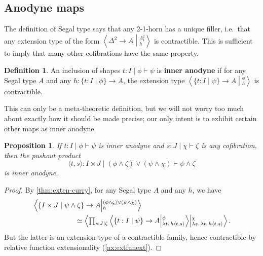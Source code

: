 \documentclass{amsart}
\theoremstyle{plain}
\newtheorem{prop}[thm]{Proposition}
\theoremstyle{definition}
\newtheorem{defn}[thm]{Definition}
\theoremstyle{remark}
\numberwithin{equation}{section}
\newcommand{\exten}[4]{\left\langle\mathchoice{\textstyle\prod_{#1}}{\textstyle\prod_{#1}}{\scriptstyle\prod_{#1}}{\scriptscriptstyle\prod_{#1}} #2 \middle|^{#3}_{#4}\right\rangle}
\newcommand{\ndexten}[4]{\left\langle #1 \to #2 \middle|^{#3}_{#4}\right\rangle}
\newcommand{\types}{\vdash}
\newcommand{\sh}[2]{\{#1\mid #2\}}
\newcommand{\pair}[1]{\langle #1\rangle}
\newcommand{\lam}[1]{\lambda #1.\,}
\begin{document}
\subsection{Anodyne maps}
\label{sec:anodyne}

The definition of Segal type says that any 2-1-horn has a unique filler, i.e.\ that any extension type of the form $\ndexten{\Delta^2}{A}{\Lambda^2_1}{h}$ is contractible.
This is sufficient to imply that many other cofibrations have the same property.

\begin{defn}
  An inclusion of shapes $t:I \mid \phi\types\psi$ is \textbf{inner anodyne} if for any Segal type $A$ and any $h:\sh{t:I}{\phi}\to A$, the extension type $\ndexten{\sh{t:I}{\psi}}{A}{\phi}{h}$ is contractible.
\end{defn}

This can only be a meta-theoretic definition, but we will not worry too much about exactly how it should be made precise; our only intent is to exhibit certain other maps as inner anodyne.

\begin{prop}\label{thm:pop-anodyne}
  If $t:I \mid \phi\types\psi$ is inner anodyne and $s:J \mid \chi \types \zeta$ is any cofibration, then the pushout product
  \[ {\pair{t,s}:I\times J} \mid {(\phi\land\zeta)\lor(\psi\land\chi)} \types \psi\land \zeta \]
  is inner anodyne.
\end{prop}
\begin{proof}
  By \cref{thm:exten-curry}, for any Segal type $A$ and any $h$, we have
  \begin{align*}
&    \ndexten{\sh{I\times J}{\psi\land\zeta}}{A}{(\phi\land\zeta)\lor(\psi\land\chi)}{h}\\
    &\qquad\qquad\qquad\simeq \exten{s:J|\zeta}{\ndexten{\sh{t:I}{\psi}}{A}{\phi}{\lam{t}h{\pair{t,s}}}}{\chi}{\lam{s}\lam{t}h{\pair{t,s}}}.
  \end{align*}
  But the latter is an extension type of a contractible family, hence contractible by relative function extensionality (\cref{ax:extfunext}).
\end{proof}
\end{document}
